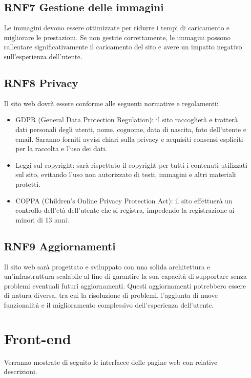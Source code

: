 \documentclass[a4paper,12pt]{article}
\begin{document}
\subsection*{RNF7 Gestione delle immagini}
Le immagini devono essere ottimizzate per ridurre i tempi di caricamento e migliorare le prestazioni. Se non gestite correttamente, le immagini possono rallentare significativamente il caricamento del sito e avere un impatto negativo sull'esperienza dell'utente.


\subsection*{RNF8 Privacy}
Il sito web dovrà essere conforme alle seguenti normative e regolamenti:
\begin{itemize}
    \item GDPR (General Data Protection Regulation): il sito raccoglierà e tratterà dati personali degli utenti, nome, cognome, data di nascita, foto dell'utente e email. Saranno forniti avvisi chiari sulla privacy e acquisiti consensi espliciti per la raccolta e l'uso dei dati.
    \item Leggi sul copyright: sarà rispettato il copyright per tutti i contenuti utilizzati sul sito, evitando l'uso non autorizzato di testi, immagini e altri materiali protetti.
    \item COPPA (Children's Online Privacy Protection Act): il sito effettuerà un controllo dell'età dell'utente che si registra, impedendo la registrazione ai minori di 13 anni.
\end{itemize}


\subsection*{RNF9 Aggiornamenti} 
Il sito web sarà progettato e sviluppato con una solida architettura e un'infrastruttura scalabile al fine di garantire la sua capacità di supportare senza problemi eventuali futuri aggiornamenti. Questi aggiornamenti potrebbero essere di natura diversa, tra cui la risoluzione di problemi, l'aggiunta di nuove funzionalità e il miglioramento complessivo dell'esperienza dell'utente.


\newpage
\section{Front-end}
Verranno mostrate di seguito le interfacce delle pagine web con relative descrizioni.
\end{document}
